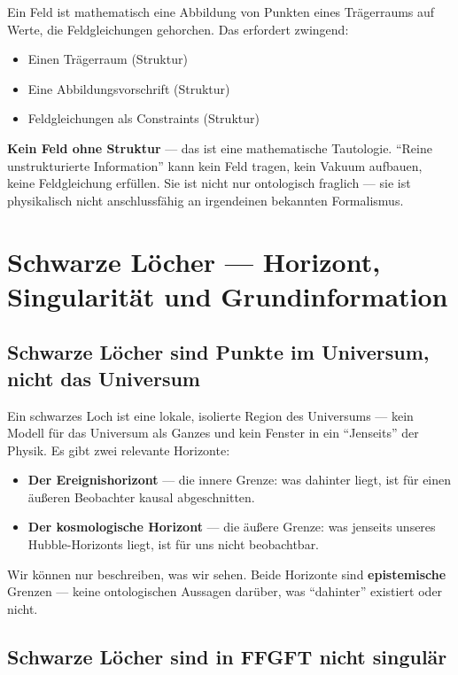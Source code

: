 Ein Feld ist mathematisch eine Abbildung von Punkten eines Trägerraums auf Werte, die Feldgleichungen gehorchen. Das erfordert zwingend:
\begin{itemize}
  \item Einen Trägerraum (Struktur)
  \item Eine Abbildungsvorschrift (Struktur)
  \item Feldgleichungen als Constraints (Struktur)
\end{itemize}

\textbf{Kein Feld ohne Struktur} --- das ist eine mathematische Tautologie. ``Reine unstrukturierte Information'' kann kein Feld tragen, kein Vakuum aufbauen, keine Feldgleichung erfüllen. Sie ist nicht nur ontologisch fraglich --- sie ist physikalisch nicht anschlussfähig an irgendeinen bekannten Formalismus.

\section{Schwarze Löcher --- Horizont, Singularität und Grundinformation}

\subsection{Schwarze Löcher sind Punkte im Universum, nicht das Universum}

Ein schwarzes Loch ist eine lokale, isolierte Region des Universums --- kein Modell für das Universum als Ganzes und kein Fenster in ein ``Jenseits'' der Physik. Es gibt zwei relevante Horizonte:
\begin{itemize}
  \item \textbf{Der Ereignishorizont} --- die innere Grenze: was dahinter liegt, ist für einen äußeren Beobachter kausal abgeschnitten.
  \item \textbf{Der kosmologische Horizont} --- die äußere Grenze: was jenseits unseres Hubble-Horizonts liegt, ist für uns nicht beobachtbar.
\end{itemize}

Wir können nur beschreiben, was wir sehen. Beide Horizonte sind \textbf{epistemische} Grenzen --- keine ontologischen Aussagen darüber, was ``dahinter'' existiert oder nicht.

\subsection{Schwarze Löcher sind in FFGFT nicht singulär}

